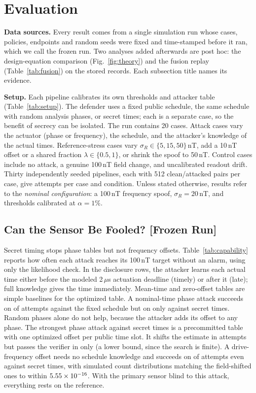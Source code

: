 \documentclass[conference,9pt]{IEEEtran}
\begin{document}
\section{Evaluation}
\label{sec:eval}

\textbf{Data sources.} Every result comes from a single simulation run whose cases, policies,
endpoints and random seeds were fixed and time-stamped before it ran, which we call the frozen run.
Two analyses added afterwards are post hoc: the design-equation comparison (Fig.~\ref{fig:theory})
and the fusion replay (Table~\ref{tab:fusion}) on the stored records. Each subsection title names
its evidence.

\textbf{Setup.} Each pipeline calibrates its own thresholds and attacker table (Table~\ref{tab:setup}). The defender uses a fixed public schedule, the same schedule with random analysis phases, or
secret times; each is a separate case, so the benefit of secrecy can be isolated. The run
contains 20 cases. Attack cases vary the actuator (phase or frequency), the schedule, and the
attacker's knowledge of the actual times. Reference-stress cases vary $\sigma_R\in\{5,15,50\}$\,nT,
add a 10\,nT offset or a shared fraction $\lambda\in\{0.5,1\}$, or shrink the spoof to 50\,nT.
Control cases include no attack, a genuine 100\,nT field change, and uncalibrated readout drift.
Thirty independently seeded pipelines, each with 512 clean/attacked pairs per case, give \TotalN{}
attempts per case and condition. Unless
stated otherwise, results
refer to the \emph{nominal configuration}: a 100\,nT frequency spoof, $\sigma_R=20$\,nT, and
thresholds calibrated at $\alpha=1\%$.

\subsection{Can the Sensor Be Fooled? [Frozen Run]}

Secret timing stops phase tables but not frequency offsets. Table~\ref{tab:capability} reports how often each attack reaches its 100\,nT target without an
alarm, using only the likelihood check. In the disclosure rows, the attacker learns each actual time either before the modeled 2\,$\mu$s actuation deadline (timely) or after it (late); full knowledge gives the time
immediately. Mean-time and zero-offset tables are simple baselines for the optimized table. A nominal-time phase
attack succeeds on \FixedU{} of \TotalN{} attempts against the fixed schedule but on only
\HiddenU{} against secret times. Random phases alone do not help, because the attacker adds its offset to any phase. The strongest phase attack against secret times is a precommitted table with one optimized offset
per public time slot. It shifts the estimate in \OptimizedT{} attempts but passes the verifier in only
\OptimizedU{} (a lower bound, since the search is finite). A drive-frequency offset needs no schedule knowledge and succeeds on \FrequencyU{} of
\TotalN{} attempts even against secret times, with simulated count distributions matching the
field-shifted ones to within $5.55\times 10^{-16}$. With the primary sensor blind to this attack,
everything rests on the reference.
\end{document}
